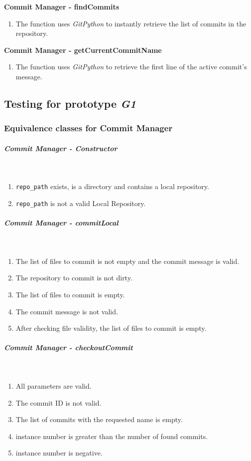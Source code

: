 \textbf{Commit Manager - findCommits}
\begin{enumerate}
    \item The function uses \emph{GitPython} to instantly retrieve the list of commits in the repository.
\end{enumerate}

\textbf{Commit Manager - getCurrentCommitName}
\begin{enumerate}
    \item The function uses \emph{GitPython} to retrieve the first line of the active commit's message.
\end{enumerate}


\subsection{Testing for prototype \emph{G1}}

\subsubsection{Equivalence classes for Commit Manager}

\subparagraph{Commit Manager - Constructor} \mbox{}\\
\begin{enumerate}
    \item \texttt{repo\_path} exists, is a directory and contains a local repository.
    \item \texttt{repo\_path} is not a valid Local Repository.
\end{enumerate}

\subparagraph{Commit Manager - commitLocal} \mbox{}\\
\begin{enumerate}
    \item The list of files to commit is not empty and the commit message is valid.
    \item The repository to commit is not dirty.
    \item The list of files to commit is empty.
    \item The commit message is not valid.
    \item After checking file validity, the list of files to commit is empty.
\end{enumerate}

\subparagraph{Commit Manager - checkoutCommit} \mbox{}\\
\begin{enumerate}
    \item All parameters are valid.
    \item The commit ID is not valid.
    \item The list of commits with the requested name is empty.
    \item instance number is greater than the number of found commits.
    \item instance number is negative.
\end{enumerate}


